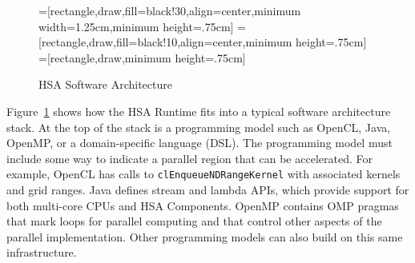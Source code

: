 \documentclass[final]{book}
\begin{document}
\begin{figure}
  \centering
  =[rectangle,draw,fill=black!30,align=center,minimum width=1.25cm,minimum height=.75cm]
  =[rectangle,draw,fill=black!10,align=center,minimum height=.75cm]
  =[rectangle,draw,minimum height=.75cm]
  \caption{HSA Software Architecture}
  \label{fig:swarch}
\end{figure}

Figure~\ref{fig:swarch} shows how the HSA Runtime fits into a typical software
architecture stack. At the top of the stack is a programming model such as
OpenCL\texttrademark, Java, OpenMP, or a domain-specific language (DSL). The
programming model must include some way to indicate a parallel region that can
be accelerated. For example, OpenCL has calls to \texttt{clEnqueueNDRangeKernel}
with associated kernels and grid ranges. Java defines stream and lambda APIs,
which provide support for both multi-core CPUs and HSA Components. OpenMP
contains OMP pragmas that mark loops for parallel computing and that control 
other aspects of the parallel implementation. Other programming models can also 
build on this same infrastructure.
\end{document}
